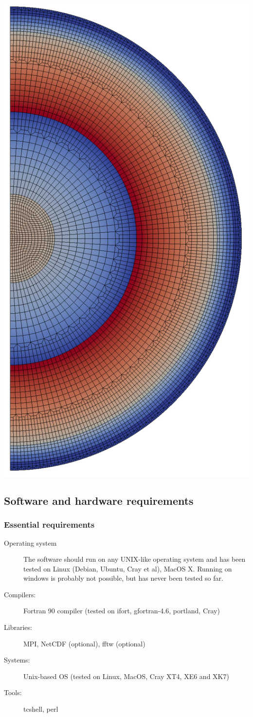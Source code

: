 \documentclass{article}
\begin{document}
\begin{center}
\begin{minipage}[t]{0.25\paperwidth}
        \includegraphics[width=.7\textwidth]{mesh.png}
    \end{minipage}%
\end{center}

\newpage
\subsection{Software and hardware requirements}

\subsubsection{Essential requirements}
\begin{description}
 \item[Operating system] The software should run on any UNIX-like operating system and has been tested on Linux (Debian, Ubuntu, Cray et al), MacOS X. Running on windows is probably not possible, but has never been tested so far.
 \item[Compilers:] Fortran 90 compiler (tested on ifort, gfortran-4.6,
   portland, Cray)
 \item[Libraries:] MPI, NetCDF (optional), fftw (optional)
 \item[Systems:] Unix-based OS (tested on Linux, MacOS, Cray XT4, XE6 and XK7)
 \item[Tools:] tcshell, perl
\end{description}
\end{document}
